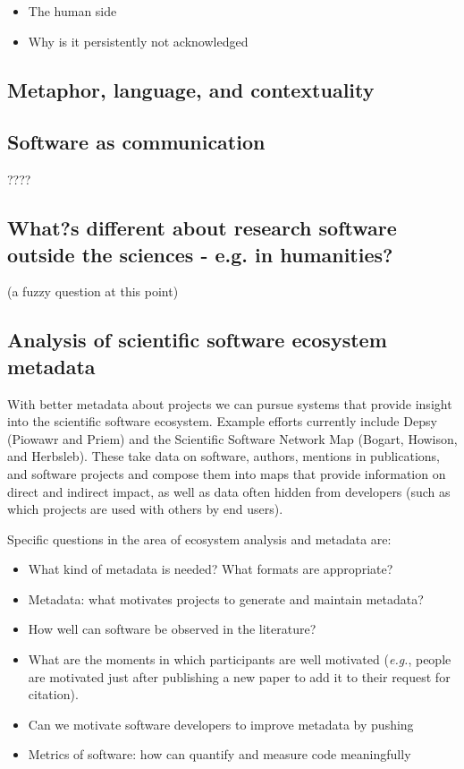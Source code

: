 \documentclass[a4paper,UKenglish]{dagman}
\newcommand{\eg}{\emph{e.g.},\xspace}
\begin{document}
\begin{itemize}
\item The human side
\item Why is it persistently not acknowledged
\end{itemize}

\subsection{Metaphor, language, and contextuality}

\subsection{Software as communication}

 ????


\subsection{What?s different about research software outside the sciences - e.g. in humanities?}

(a fuzzy question at this point)

\subsection{Analysis of scientific software ecosystem metadata}

With better metadata about projects we can pursue systems that provide insight into the scientific software ecosystem. Example efforts currently include Depsy (Piowawr and Priem) and the Scientific Software Network Map (Bogart, Howison, and Herbsleb). These take data on software, authors, mentions in publications, and software projects and compose them into maps that provide information on direct and indirect impact, as well as data often hidden from developers (such as which projects are used with others by end users).

Specific questions in the area of ecosystem analysis and metadata are:

\begin{itemize}
\item What kind of metadata is needed? What formats are appropriate?
\item Metadata: what motivates projects to generate and maintain metadata?
\item How well can software be observed in the literature?
\item What are the moments in which participants are well motivated (\eg people are motivated just after publishing a new paper to add it to their request for citation).
\item Can we motivate software developers to improve metadata by pushing 
\item Metrics of software: how can quantify and measure code meaningfully
\end{itemize}
\end{document}
